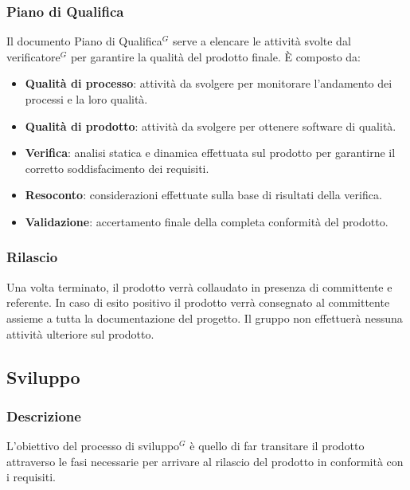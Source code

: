 \documentclass[a4paper,10pt]{article}
\begin{document}
\subsubsection{Piano di Qualifica}
Il documento Piano di Qualifica$^G$ serve a elencare le attività svolte dal verificatore$^G$ per garantire la qualità
del prodotto finale. È composto da:
\begin{itemize}
    \item \textbf{Qualità di processo}: attività da svolgere per monitorare l'andamento dei processi e la loro qualità.
    \item \textbf{Qualità di prodotto}: attività da svolgere per ottenere software di qualità.
    \item \textbf{Verifica}: analisi statica e dinamica effettuata sul prodotto per garantirne il corretto soddisfacimento dei requisiti.
    \item \textbf{Resoconto}: considerazioni effettuate sulla base di risultati della verifica.
    \item \textbf{Validazione}: accertamento finale della completa conformità del prodotto. 
\end{itemize}
\subsubsection{Rilascio}
Una volta terminato, il prodotto verrà collaudato in presenza di committente e referente. 
In caso di esito positivo il prodotto verrà consegnato al committente assieme a tutta la documentazione del progetto.
Il gruppo non effettuerà nessuna attività ulteriore sul prodotto.

\subsection{Sviluppo}
\subsubsection{Descrizione}
L'obiettivo del processo di sviluppo$^G$ è quello di far transitare il prodotto attraverso le fasi necessarie per arrivare
al rilascio del prodotto in conformità con i requisiti.
\end{document}
